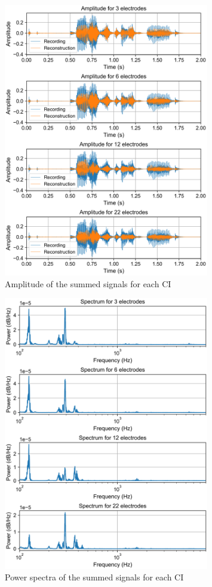 \documentclass{scrartcl}
\begin{document}
\begin{figure}[p]
	\centering
	\includegraphics[width=0.8\textwidth]{figures/amplitude_sum}
	\caption{Amplitude of the summed signals for each CI}
	\label{fig:amplitude_sum}
\end{figure}
\begin{figure}[p]
	\centering
	\includegraphics[width=0.8\textwidth]{figures/spectra}
	\caption{Power spectra of the summed signals for each CI}
	\label{fig:spectra}
\end{figure}
\end{document}
